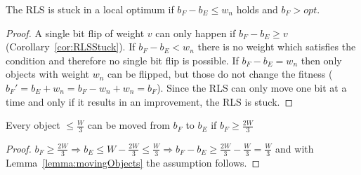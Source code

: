 \begin{corollary}\label{cor:RLSStuck}
    The RLS is stuck in a local optimum if \(b_F-b_E \le w_n\) holds and \(b_F > opt\).
\end{corollary}
\begin{proof}
    A single bit flip of weight $v$ can only happen if \(b_F - b_E \ge v\) (Corollary~\ref{cor:RLSStuck}). If \(b_F-b_E < w_n\) there is no weight which satisfies the condition and therefore no single bit flip is possible.
    If \(b_F-b_E = w_n\) then only objects with weight \(w_n\) can be flipped, but those do not change the fitness ($b_F' = b_E + w_n = b_F - w_n +w_n = b_F$).
    Since the RLS can only move one bit at a time and only if it results in an improvement, the RLS is stuck.
\end{proof}

\begin{corollary}\label{cor:movingObjects}
    Every object \(\le \frac{W}{3}\) can be moved from $b_F$ to $b_E$ if \(b_F \ge \frac{2W}{3}\)
\end{corollary}
\begin{proof}
    \(b_F \ge \frac{2W}{3} \Rightarrow b_E \le W - \frac{2W}{3} \le \frac{W}{3} \Rightarrow b_F - b_E \ge \frac{2W}{3} - \frac{W}{3} = \frac{W}{3}\) and with Lemma~\ref{lemma:movingObjects} the assumption follows.
\end{proof}

